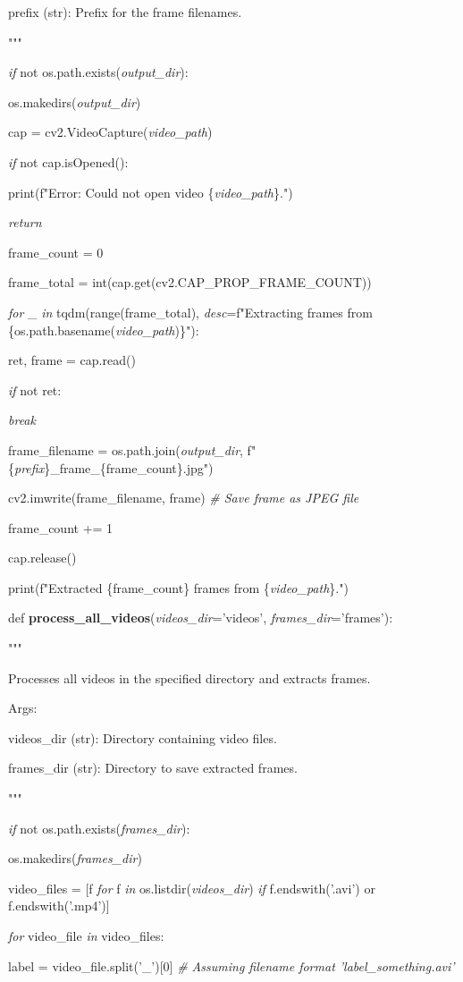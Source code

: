 \documentclass[
]{article}
\begin{document}
prefix (str): Prefix for the frame filenames.

"""

\emph{if} not os.path.exists(\emph{output\_dir}):

os.makedirs(\emph{output\_dir})

cap = cv2.VideoCapture(\emph{video\_path})

\emph{if} not cap.isOpened():

print(f"Error: Could not open video \{\emph{video\_path}\}.")

\emph{return}

frame\_count = 0

frame\_total = int(cap.get(cv2.CAP\_PROP\_FRAME\_COUNT))

\emph{for} \_ \emph{in} tqdm(range(frame\_total), \emph{desc}=f"Extracting frames from \{os.path.basename(\emph{video\_path})\}"):

ret, frame = cap.read()

\emph{if} not ret:

\emph{break}

frame\_filename = os.path.join(\emph{output\_dir}, f"\{\emph{prefix}\}\_frame\_\{frame\_count\}.jpg")

cv2.imwrite(frame\_filename, frame) \emph{\# Save frame as JPEG file}

frame\_count += 1

cap.release()

print(f"Extracted \{frame\_count\} frames from \{\emph{video\_path}\}.")

def \textbf{process\_all\_videos}(\emph{videos\_dir}='videos', \emph{frames\_dir}='frames'):

"""

Processes all videos in the specified directory and extracts frames.

Args:

videos\_dir (str): Directory containing video files.

frames\_dir (str): Directory to save extracted frames.

"""

\emph{if} not os.path.exists(\emph{frames\_dir}):

os.makedirs(\emph{frames\_dir})

video\_files = {[}f \emph{for} f \emph{in} os.listdir(\emph{videos\_dir}) \emph{if} f.endswith('.avi') or f.endswith('.mp4'){]}

\emph{for} video\_file \emph{in} video\_files:

label = video\_file.split('\_'){[}0{]} \emph{\# Assuming filename format 'label\_something.avi'}
\end{document}
